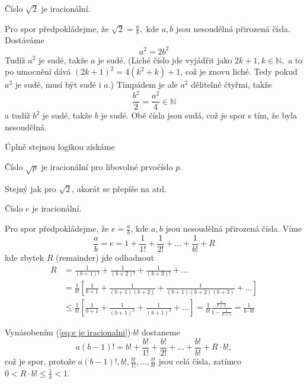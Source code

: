 \begin{věta}
  Číslo $\sqrt{2}$ je iracionální.
\end{věta}
\begin{důkaz}
  Pro spor předpokládejme, že $\sqrt{2}=\frac{a}{b},$ kde $a,b$ jsou nesoudělná přirozená čísla. Dostáváme
  \begin{equation*}
    a^{2}=2b^{2}
  \end{equation*}
  Tudíž $a^{2}$ je sudé, takže $a$ je sudé. (Liché číslo jde vyjádřit jako $2k+1, k\in \mathbb{N},$ a to po umocnění dává $(2k+1)^{2}=4(k^{2}+k)+1$, což je znovu liché. Tedy pokud $a^{2}$ je sudé, musí být sudé i $a$.) Tímpádem je ale $a^{2}$ dělitelné čtyřmi, takže
  \begin{equation*}
    \frac{b^{2}}{2}=\frac{a^{2}}{4}\in \mathbb{N}
  \end{equation*}
  a tudíž $b^{2}$ je sudé, takže $b$ je sudé. Obě čísla jsou sudá, což je spor s tím, že byla nesoudělná.
\end{důkaz}
Úplně stejnou logikou získáme
\begin{věta}
  Číslo $\sqrt{p}$ je iracionální pro libovolné prvočíslo $p$.
\end{věta}
\begin{důkaz}
	Stejný jak pro $\sqrt{2}$, akorát se přepíše  na  atd.
\end{důkaz}
\begin{věta}
  Číslo $e$ je iracionální.
\end{věta}
\begin{důkaz}
  Pro spor předpokládejme, že $e=\frac{a}{b}$, kde $a,b$ jsou nesoudělná přirozená čísla. Víme
  \begin{equation}\label{eq:e je iracionalni}
    \frac{a}{b} = e = 1+\frac{1}{1!}+\frac{1}{2!}+\hdots + \frac{1}{b!} + R
  \end{equation}
  kde zbytek $R$ (remainder) jde odhadnout
  \begin{align*}
	  R &= \frac{1}{(b+1)!}+\frac{1}{(b+2)!}+\frac{1}{(b+3)!}+\hdots \\
	    &= \frac{1}{b!}\left[\frac{1}{b+1}+\frac{1}{(b+1)(b+2)}+\frac{1}{(b+1)(b+2)(b+3)}+\hdots \right] \\
	  &\leq \frac{1}{b!}\left[\frac{1}{b+1}+\frac{1}{(b+1)^{2}}+\frac{1}{(b+1)^{3}}+\hdots \right] = \frac{1}{b!}\frac{\frac{1}{b+1}}{1-\frac{1}{b+1}}=\frac{1}{b\cdot b!}
  \end{align*}
\end{důkaz}
Vynásobením (\ref{eq:e je iracionalni})$\cdot b!$ dostaneme
\begin{equation*}
	a(b-1)! =  b!+\frac{b!}{1!}+\frac{b!}{2!}+\hdots + \frac{b!}{b!} + R\cdot b!,
\end{equation*}
což je spor, protože $a(b-1)!, b!, \frac{b!}{1!},\hdots, \frac{b!}{b!}$ jsou celá čísla, zatímco $0 < R\cdot b! \leq \frac{1}{b} < 1.$

